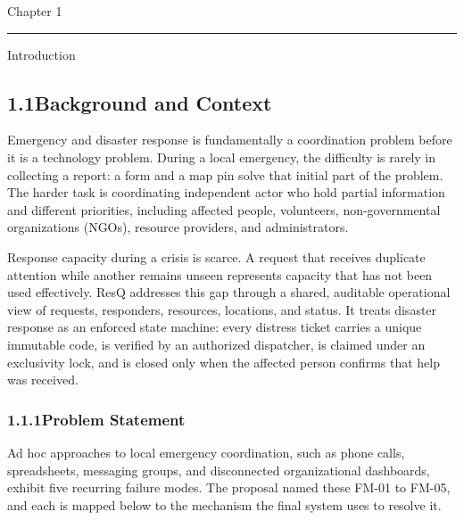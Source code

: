 \documentclass[11pt,a4paper]{article}
\newcommand{\chaptertitle}[2]{%
  \vspace*{0pt}%
  {\normalfont\fontsize{22}{25}\selectfont #1\par}%
  \vspace{2pt}%
  \noindent\rule{\textwidth}{0.7pt}\par
  \vspace{7pt}%
  {\normalfont\fontsize{22}{25}\selectfont #2\par}
  \vspace{5pt}%
}
\begin{document}
\newpage

\label{ch1}
\chaptertitle{Chapter 1}{Introduction}

\subsection{1.1\quad Background and Context}\label{s11}

Emergency and disaster response is fundamentally a coordination problem before it is a technology problem. During a local emergency, the difficulty is rarely in collecting a report: a form and a map pin solve that initial part of the problem. The harder task is coordinating independent actor who hold partial information and different priorities, including affected people, volunteers, non-governmental organizations (NGOs), resource providers, and administrators.

Response capacity during a crisis is scarce. A request that receives duplicate attention while another remains unseen represents capacity that has not been used effectively. ResQ addresses this gap through a shared, auditable operational view of requests, responders, resources, locations, and status. It treats disaster response as an enforced state machine: every distress ticket carries a unique immutable code, is verified by an authorized dispatcher, is claimed under an exclusivity lock, and is closed only when the affected person confirms that help was received.

\subsubsection{1.1.1\quad Problem Statement}\label{s111}

Ad hoc approaches to local emergency coordination, such as phone calls, spreadsheets, messaging groups, and disconnected organizational dashboards, exhibit five recurring failure modes. The proposal named these FM-01 to FM-05, and each is mapped below to the mechanism the final system uses to resolve it.
\end{document}
